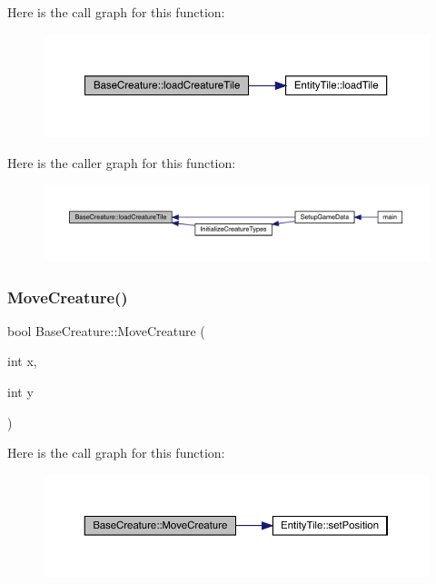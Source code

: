 Here is the call graph for this function\+:
\nopagebreak
\begin{figure}[H]
\begin{center}
\leavevmode
\includegraphics[width=350pt]{d2/d3b/class_base_creature_af2066b8eb62bf595d30feae6671e4495_cgraph}
\end{center}
\end{figure}
Here is the caller graph for this function\+:
\nopagebreak
\begin{figure}[H]
\begin{center}
\leavevmode
\includegraphics[width=350pt]{d2/d3b/class_base_creature_af2066b8eb62bf595d30feae6671e4495_icgraph}
\end{center}
\end{figure}
\mbox{\label{class_base_creature_a77f0a7d7c441406c252c3278817454d8}} 
\subsubsection{\texorpdfstring{Move\+Creature()}{MoveCreature()}}
{\footnotesize\ttfamily bool Base\+Creature\+::\+Move\+Creature (\begin{DoxyParamCaption}\item[{int}]{x,  }\item[{int}]{y }\end{DoxyParamCaption})}

Here is the call graph for this function\+:
\nopagebreak
\begin{figure}[H]
\begin{center}
\leavevmode
\includegraphics[width=350pt]{d2/d3b/class_base_creature_a77f0a7d7c441406c252c3278817454d8_cgraph}
\end{center}
\end{figure}
\mbox{\label{class_base_creature_a2d45724079ff2eeb6606b222e405e4a8}} 
